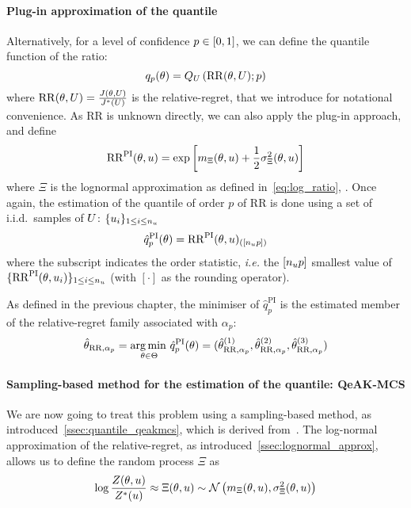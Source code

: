 \documentclass[../../Main_ManuscritThese.tex]{subfiles}
\begin{document}
\paragraph{Plug-in approximation of the quantile}
Alternatively, for a level of confidence
$p \in \interval{0}{1}$, we can define the quantile function of the
ratio:
\begin{equation}
  q_p(\theta) = Q_{U}\left(\mathrm{RR}(\theta, U);p \right)
\end{equation}
where $\mathrm{RR}(\theta, U)=\frac{J(\theta, U)}{J^*(U)}$ is the
relative-regret, that we introduce for notational convenience.  As
$\mathrm{RR}$ is unknown directly, we can also apply the plug-in
approach, and define
\begin{equation}
  \mathrm{RR}^{\mathrm{PI}}(\theta, u) = \exp\left[m_{\Xi}(\theta, u) + \frac{1}{2}\sigma^2_{\Xi}(\theta, u)\right]
\end{equation}
where $\Xi$ is the lognormal approximation as defined
in~\cref{eq:log_ratio}, . Once again, the
estimation of the quantile of order $p$ of $\mathrm{RR}$ is done using
a set of i.i.d.\ samples of $U$: $\{u_i\}_{1\leq i \leq n_{u}}$
\begin{equation}
  \label{eq:RRPI}
  \hat{q}_p^{\mathrm{PI}}(\theta) = {\mathrm{RR}}^{\mathrm{PI}}(\theta, u)_{(\left[n_{u}p\right])}
\end{equation}
where the subscript indicates the order statistic, \emph{i.e.} the
$\left[n_{u}p\right]$ smallest value of
$\{\mathrm{RR}^\mathrm{PI}(\theta,u_i)\}_{1\leq i\leq n_u}$ (with
$[\cdot]$ as the rounding operator). 

As defined in the previous chapter, the minimiser of
$\hat{q}_p^{\mathrm{PI}}$ is the estimated member of the
relative-regret family associated with $\alpha_p$:
\begin{equation}
  \hat{\theta}_{\mathrm{RR},\alpha_p} = \operatorname*{arg\,min \,}_{\theta \in \Theta} \hat{q}^{\mathrm{PI}}_p(\theta) = (\hat{\theta}^{(1)}_{\mathrm{RR},\alpha_p}, \hat{\theta}^{(2)}_{\mathrm{RR},\alpha_p},\hat{\theta}^{(3)}_{\mathrm{RR},\alpha_p})
\end{equation}
\paragraph{Sampling-based method for the estimation of the quantile: QeAK-MCS}
We are now going to treat this problem using a sampling-based method,
as introduced~\cref{ssec:quantile_qeakmcs}, which is derived
from~\cite{razaaly_rare_2019}.  The log-normal approximation of the
relative-regret, as introduced~\cref{ssec:lognormal_approx}, allows us
to define the random process $\Xi$ as
\begin{equation}
  \log \frac{Z(\theta, u)}{Z^*(u)} \approx \Xi(\theta, u) \sim \mathcal{N}\left(m_{\Xi}(\theta, u),\sigma^2_{\Xi}(\theta, u)\right)
\end{equation}
\end{document}
